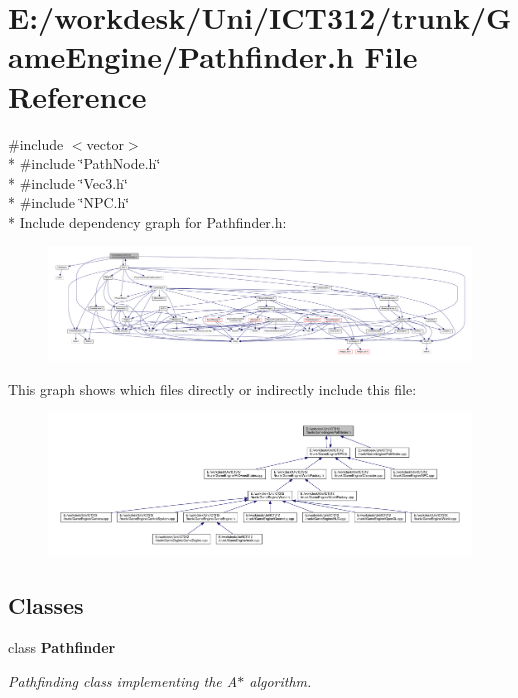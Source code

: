 \section{E\+:/workdesk/\+Uni/\+I\+C\+T312/trunk/\+Game\+Engine/\+Pathfinder.h File Reference}
\label{_pathfinder_8h}
{\ttfamily \#include $<$vector$>$}\\*
{\ttfamily \#include \char`\"{}Path\+Node.\+h\char`\"{}}\\*
{\ttfamily \#include \char`\"{}Vec3.\+h\char`\"{}}\\*
{\ttfamily \#include \char`\"{}N\+P\+C.\+h\char`\"{}}\\*
Include dependency graph for Pathfinder.\+h\+:
\nopagebreak
\begin{figure}[H]
\begin{center}
\leavevmode
\includegraphics[width=350pt]{d3/dcc/_pathfinder_8h__incl}
\end{center}
\end{figure}
This graph shows which files directly or indirectly include this file\+:
\nopagebreak
\begin{figure}[H]
\begin{center}
\leavevmode
\includegraphics[width=350pt]{d5/de4/_pathfinder_8h__dep__incl}
\end{center}
\end{figure}
\subsection*{Classes}
\begin{DoxyCompactItemize}
\item 
class {\bf Pathfinder}
\begin{DoxyCompactList}\small\item\em Pathfinding class implementing the A$\ast$ algorithm. \end{DoxyCompactList}\end{DoxyCompactItemize}
